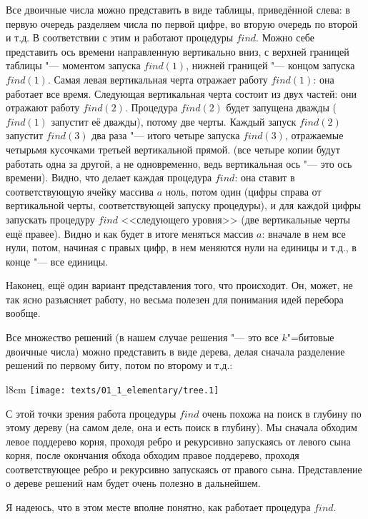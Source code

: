 Все двоичные числа можно представить в виде таблицы, приведённой слева:
в первую очередь разделяем числа по первой цифре, во вторую очередь по второй и 
т.д. В соответствии с этим и работают процедуры $find$. Можно себе представить 
ось времени направленную вертикально вниз, с верхней границей таблицы "--- моментом 
запуска $find(1)$, нижней границей "--- концом запуска $find(1)$. Самая левая 
вертикальная черта отражает работу $find(1)$: она работает все время. Следующая 
вертикальная черта состоит из двух частей: они отражают работу $find(2)$. 
Процедура $find(2)$ будет запущена дважды ($find(1)$ запустит её дважды), потому 
две черты. Каждый запуск $find(2)$ запустит $find(3)$ два раза "--- итого четыре 
запуска $find(3)$, отражаемые четырьмя кусочками третьей вертикальной прямой. 
(все четыре копии будут работать одна за другой, а не одновременно, ведь 
вертикальная ось "--- это ось времени). Видно, что делает каждая процедура $find$: 
она ставит в соответствующую ячейку массива $a$ ноль, потом один (цифры справа от 
вертикальной черты, соответствующей запуску процедуры), и для каждой цифры 
запускать процедуру $find$ <<следующего уровня>> (две вертикальные черты ещё 
правее). Видно и как будет в итоге меняться массив $a$: вначале в нем все нули, 
потом, начиная с правых цифр, в нем меняются нули на единицы и т.д., в конце 
"--- все единицы.

Наконец, ещё один вариант представления того, что происходит. Он, может, не так 
ясно разъясняет работу, но весьма полезен для понимания идей перебора вообще.

Все множество решений (в нашем случае решения "--- это все $k$"=битовые двоичные 
числа) можно представить в виде дерева, делая сначала разделение решений по 
первому биту, потом по второму и т.д.:

\begin{wrapfigure}{l}{8cm}%
\texttt{[image: texts/01\_1\_elementary/tree.1]}%
\end{wrapfigure}

С этой точки зрения работа процедуры $find$ очень похожа на поиск в глубину по этому 
дереву (на самом деле, она и есть поиск в глубину). Мы сначала обходим левое 
поддерево корня, проходя ребро и рекурсивно запускаясь от левого сына корня, 
после окончания обхода обходим правое поддерево, проходя соответствующее ребро 
и рекурсивно запускаясь от правого сына. Представление о дереве решений нам 
будет очень полезно в дальнейшем.

Я надеюсь, что в этом месте вполне понятно, как работает процедура $find$.

